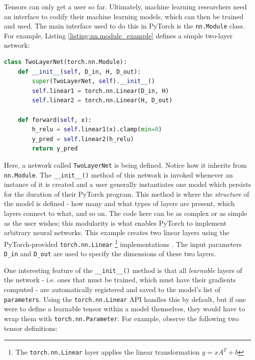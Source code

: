 \documentclass[12pt,letterpaper]{article}
\begin{document}
%
%

\label{sec:models_in_pytorch}
Tensors can only get a user so far. Ultimately, machine learning researchers need an interface to codify their machine learning models, which can then be trained and used. The main interface used to do this in PyTorch is the \texttt{nn.Module} class. For example, Listing \ref{listing:nn.module_example} defines a simple two-layer network:
\par 
\begin{lstlisting}[language=Python, caption={Definition of a simple two-layer neural network from the PyTorch documentation \cite{pytorch_tutorial}}, label={listing:nn.module_example}]
class TwoLayerNet(torch.nn.Module):
    def __init__(self, D_in, H, D_out):
        super(TwoLayerNet, self).__init__()
        self.linear1 = torch.nn.Linear(D_in, H)
        self.linear2 = torch.nn.Linear(H, D_out)

    def forward(self, x):
        h_relu = self.linear1(x).clamp(min=0)
        y_pred = self.linear2(h_relu)
        return y_pred
\end{lstlisting}
Here, a network called \texttt{TwoLayerNet} is being defined. Notice how it inherits from \texttt{nn.Module}. The \texttt{\_\_init\_\_()} method of this network is invoked whenever an instance of it is created and a user generally instantiates one model which persists for the duration of their PyTorch program. This method is where the \textit{structure} of the model is defined - how many and what types of layers are present, which layers connect to what, and so on. The code here can be as complex or as simple as the user wishes; this modularity is what enables PyTorch to implement arbitrary neural networks. This example creates two linear layers using the PyTorch-provided \texttt{torch.nn.Linear} \footnote{The \texttt{torch.nn.Linear} layer applies the linear transformation $y=xA^T + b$} implementations \cite{pytorch_docs}. The input parameters \texttt{D\_in} and \texttt{D\_out} are used to specify the dimensions of these two layers.
\par 

One interesting feature of the \texttt{\_\_init\_\_()} method is that all \textit{learnable} layers of the network - i.e. ones that must be trained, which must have their gradients computed - are automatically registered and saved to the model's list of \texttt{parameters}. Using the \texttt{torch.nn.Linear} API handles this by default, but if one were to define a learnable tensor within a model themselves, they would have to wrap them with \texttt{torch.nn.Parameter}. For example, observe the following two tensor definitions: 
\end{document}
